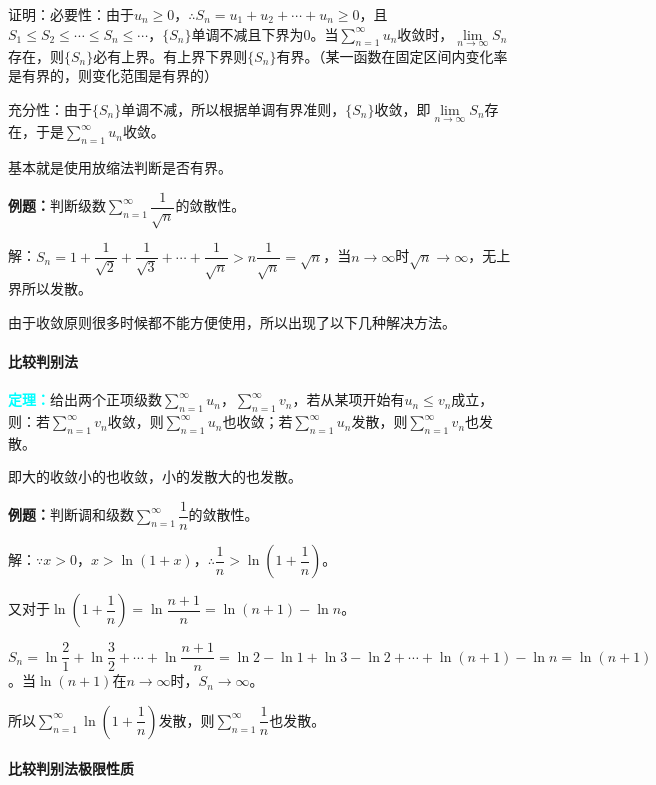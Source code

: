 \documentclass[UTF8, 12pt]{ctexart}
\begin{document}
证明：必要性：由于$u_n\geqslant0$，$\therefore S_n=u_1+u_2+\cdots+u_n\geqslant0$，且$S_1\leqslant S_2\leqslant\cdots\leqslant S_n\leqslant\cdots$，$\{S_n\}$单调不减且下界为0。当$\sum\limits_{n=1}^\infty u_n$收敛时，$\lim\limits_{n\to\infty}S_n$存在，则$\{S_n\}$必有上界。有上界下界则$\{S_n\}$有界。（某一函数在固定区间内变化率是有界的，则变化范围是有界的）

充分性：由于$\{S_n\}$单调不减，所以根据单调有界准则，$\{S_n\}$收敛，即$\lim\limits_{n\to\infty}S_n$存在，于是$\sum\limits_{n=1}^\infty u_n$收敛。

基本就是使用放缩法判断是否有界。

\textbf{例题：}判断级数$\sum\limits_{n=1}^\infty\dfrac{1}{\sqrt{n}}$的敛散性。

解：$S_n=1+\dfrac{1}{\sqrt{2}}+\dfrac{1}{\sqrt{3}}+\cdots+\dfrac{1}{\sqrt{n}}>n\dfrac{1}{\sqrt{n}}=\sqrt{n}$，当$n\to\infty$时$\sqrt{n}\to\infty$，无上界所以发散。

由于收敛原则很多时候都不能方便使用，所以出现了以下几种解决方法。

\paragraph{比较判别法} \leavevmode \medskip

\textcolor{aqua}{\textbf{定理：}}给出两个正项级数$\sum\limits_{n=1}^\infty u_n$，$\sum\limits_{n=1}^\infty v_n$，若从某项开始有$u_n\leqslant v_n$成立，则：若$\sum\limits_{n=1}^\infty v_n$收敛，则$\sum\limits_{n=1}^\infty u_n$也收敛；若$\sum\limits_{n=1}^\infty u_n$发散，则$\sum\limits_{n=1}^\infty v_n$也发散。

即大的收敛小的也收敛，小的发散大的也发散。

\textbf{例题：}判断调和级数$\sum\limits_{n=1}^\infty\dfrac{1}{n}$的敛散性。

解：$\because x>0$，$x>\ln(1+x)$，$\therefore\dfrac{1}{n}>\ln\left(1+\dfrac{1}{n}\right)$。

又对于$\ln\left(1+\dfrac{1}{n}\right)=\ln\dfrac{n+1}{n}=\ln(n+1)-\ln n$。

$S_n=\ln\dfrac{2}{1}+\ln\dfrac{3}{2}+\cdots+\ln\dfrac{n+1}{n}=\ln2-\ln1+\ln3-\ln2+\cdots+\ln(n+1)-\ln n=\ln(n+1)$。当$\ln(n+1)$在$n\to\infty$时，$S_n\to\infty$。

所以$\sum\limits_{n=1}^\infty\ln\left(1+\dfrac{1}{n}\right)$发散，则$\sum\limits_{n=1}^\infty\dfrac{1}{n}$也发散。

\paragraph{比较判别法极限性质} \leavevmode \medskip
\end{document}
